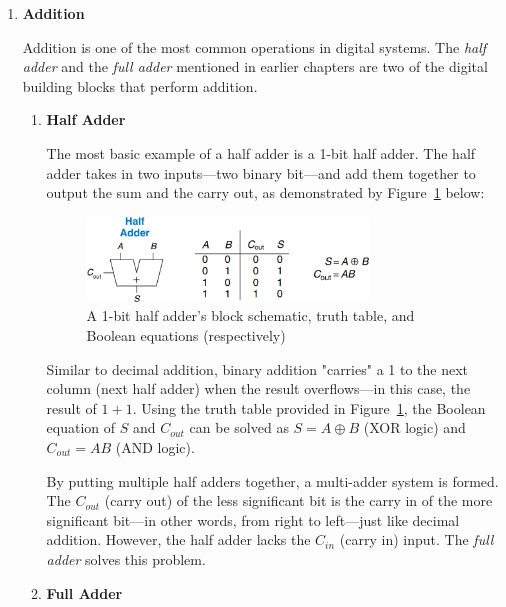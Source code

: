 \documentclass[12pt]{article}
\numberwithin{figure}{subsection}
\numberwithin{table}{subsection}
\numberwithin{equation}{subsection}
\begin{document}
\begin{enumerate}
  \item \textbf{Addition}

  Addition is one of the most common operations in digital systems. The \textit{half adder} and the \textit{full adder} mentioned in earlier chapters are two of the digital building blocks that perform addition.

  \begin{enumerate}
    \item \textbf{Half Adder}

    The most basic example of a half adder is a 1-bit half adder. The half adder takes in two inputs---two binary bit---and add them together to output the sum and the carry out, as demonstrated by Figure~\ref{fig:1_bit_half_adder} below:

    \newpage

    \begin{figure}[ht]
      \centering
      \includegraphics[width=0.75\textwidth]{half_adder_1_bit.png}
      \caption{A 1-bit half adder's block schematic, truth table, and Boolean equations (respectively)}
      \label{fig:1_bit_half_adder}
    \end{figure}

    Similar to decimal addition, binary addition "carries" a 1 to the next column (next half adder) when the result overflows---in this case, the result of $1 + 1$. Using the truth table provided in Figure~\ref{fig:1_bit_half_adder}, the Boolean equation of $S$ and $C_{out}$ can be solved as $S = A \oplus B$ (XOR logic) and $C_{out} = AB$ (AND logic).

    By putting multiple half adders together, a multi-adder system is formed. The $C_{out}$ (carry out) of the less significant bit is the carry in of the more significant bit---in other words, from right to left---just like decimal addition. However, the half adder lacks the $C_{in}$ (carry in) input. The \textit{full adder} solves this problem.

    \item \textbf{Full Adder}


\end{enumerate}
\end{enumerate}
\end{document}
